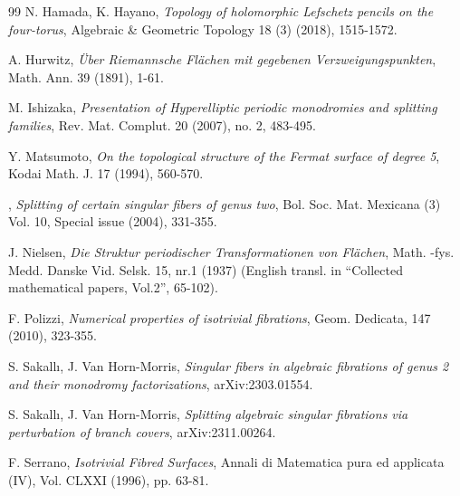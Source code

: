 \documentclass[10pt,a4paper,reqno]{amsart}
\theoremstyle{definition}
\numberwithin{equation}{section}
\numberwithin{figure}{section}
\begin{document}
\begin{thebibliography}{99}
 N. Hamada, K. Hayano,
	{\em Topology of holomorphic Lefschetz pencils on the four-torus},
	Algebraic \& Geometric Topology 18 (3) (2018), 1515-1572.

 A. Hurwitz,
	{\em \"{U}ber Riemannsche Fl\"{a}chen mit gegebenen Verzweigungspunkten},
	Math. Ann. 39 (1891), 1-61.
	
 M. Ishizaka,
	{\em Presentation of Hyperelliptic periodic monodromies and splitting families},
	Rev. Mat. Complut. 20 (2007), no. 2, 483-495.	


 Y. Matsumoto,
	{\em On the topological structure of the Fermat surface of degree 5},
	Kodai Math. J. 17 (1994), 560-570.
	
		
 \bysame,
	{\em Splitting of certain singular fibers of genus two},
	Bol. Soc. Mat. Mexicana (3) Vol. 10, Special issue (2004), 331-355.
	

 J. Nielsen,
	{\em Die Struktur periodischer Transformationen von Fl\"{a}chen},
	Math. -fys. Medd. Danske Vid. Selsk. 15, nr.1 (1937)
	(English transl. in ``Collected mathematical papers, Vol.2'', 65-102).
	
 F. Polizzi,
	{\em Numerical properties of isotrivial fibrations},
	Geom. Dedicata, 147 (2010), 323-355.

 S. Sakall{\i}, J. Van Horn-Morris,
	{\em Singular fibers in algebraic fibrations of genus 2 and their monodromy factorizations},
	arXiv:2303.01554.

 S. Sakall{\i}, J. Van Horn-Morris,
	{\em Splitting algebraic singular fibrations via perturbation of branch covers},
	arXiv:2311.00264.

	
 F. Serrano,
	{\em Isotrivial Fibred Surfaces},
	Annali di Matematica pura ed applicata (IV), Vol. CLXXI (1996), pp. 63-81.
	
	
\end{thebibliography}	
\end{document}
